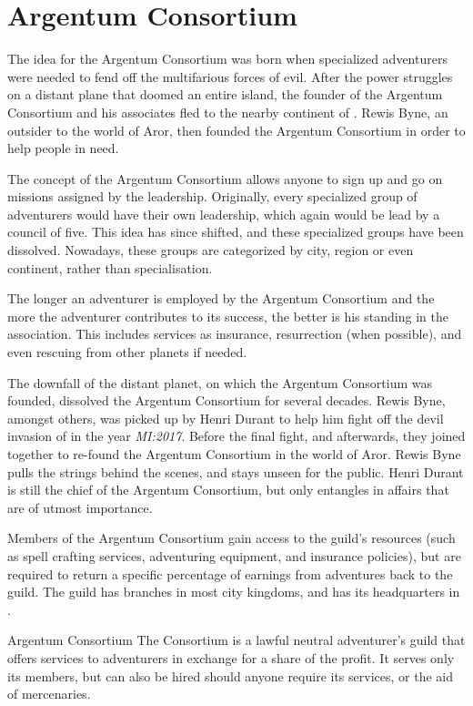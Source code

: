 \section{Argentum Consortium}
\label{sec:Argentum Consortium}

The idea for the Argentum Consortium was born when specialized adventurers were
needed to fend off the multifarious forces of evil. After the power struggles on
a distant plane that doomed an entire island, the founder of the Argentum
Consortium and his associates fled to the nearby continent of
. Rewis Byne, an outsider to the world of Aror, then
founded the Argentum Consortium in order to help people in need.

The concept of the Argentum Consortium allows anyone to sign up and go on
missions assigned by the leadership. Originally, every specialized group of
adventurers would have their own leadership, which again would be lead by a
council of five. This idea has since shifted, and these specialized groups have
been dissolved. Nowadays, these groups are categorized by city, region or even
continent, rather than specialisation.

The longer an adventurer is employed by the Argentum Consortium and the more the
adventurer contributes to its success, the better is his standing in the
association. This includes services as insurance, resurrection (when possible),
and even rescuing from other planets if needed.

The downfall of the distant planet, on which the Argentum Consortium was
founded, dissolved the Argentum Consortium for several decades. Rewis Byne,
amongst others, was picked up by Henri Durant to help him fight off the devil
invasion of  in the year \emph{MI:2017}. Before the final
fight, and afterwards, they joined together to re-found the Argentum
Consortium in the world of Aror. Rewis Byne pulls the strings behind the
scenes, and stays unseen for the public. Henri Durant is still the chief of
the Argentum Consortium, but only entangles in affairs that are of utmost
importance.

Members of the Argentum Consortium gain access to the guild's resources (such
as spell crafting services, adventuring equipment, and insurance policies),
but are required to return a specific percentage of earnings from adventures
back to the guild. The guild has branches in most city kingdoms, and has its
headquarters in .

\begin{35e}{Argentum Consortium}
  The Consortium is a lawful neutral adventurer's guild that offers services
  to adventurers in exchange for a share of the profit. It serves only its
  members, but can also be hired should anyone require its services, or the
  aid of mercenaries.
\end{35e}
